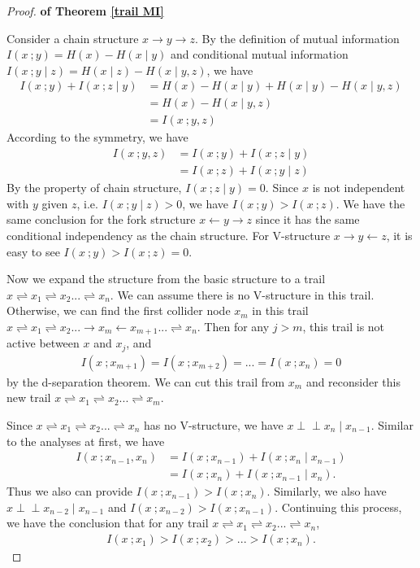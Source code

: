 \documentclass[twoside,11pt]{article}
\begin{document}
\begin{proof}{\textbf{of Theorem \ref{trail MI}}}

Consider a chain structure $x\to y\to z$. By the definition of mutual information $I(x\ ;y)=H(x)-H(x\mid y)$ and conditional mutual information $I(x\ ;y\mid z)=H(x\mid z)-H(x\mid y, z)$, we have 
\begin{align*}
I(x\ ;y)+I(x\ ;z\mid y)&=H(x)-H(x\mid y)+H(x\mid y)-H(x\mid y,z)\\
&=H(x)-H(x\mid y,z)\\
&=I(x\ ;y,z)
\end{align*}
According to the symmetry, we have
\begin{align*}
I(x\ ;y,z)&=I(x\ ;y)+I(x\ ;z\mid y)\\
&=I(x\ ;z)+I(x\ ;y\mid z)
\end{align*}
By the property of chain structure, $I(x\ ;z\mid y)=0$. Since $x$ is not independent with $y$ given $z$, i.e. $I(x\ ;y\mid z)>0$, we have $I(x\ ;y)>I(x\ ;z)$. We have the same conclusion for the fork structure $x\gets y\to z$ since it has the same conditional independency as the chain structure. For V-structure $x\to y\gets z$, it is easy to see $I(x\ ;y)>I(x\ ;z)=0$.

Now we expand the structure from the basic structure to a trail $x\rightleftharpoons x_1 \rightleftharpoons x_2 ... \rightleftharpoons x_n$. We can assume there is no V-structure in this trail. Otherwise, we can find the first collider node $x_m$ in this trail $x\rightleftharpoons x_1 \rightleftharpoons x_2 ...\to x_m \gets x_{m+1} ... \rightleftharpoons x_n$. Then for any $j>m$, this trail is not active between $x$ and $x_j$, and 
\begin{align*}
I(x\ ;x_{m+1})=I(x\ ;x_{m+2})=...=I(x\ ;x_n)=0
\end{align*}
by the d-separation theorem. We can cut this trail from $x_m$ and reconsider this new trail $x\rightleftharpoons x_1 \rightleftharpoons x_2 ... \rightleftharpoons x_m$. 

Since $x\rightleftharpoons x_1 \rightleftharpoons x_2 ... \rightleftharpoons x_n$ has no V-structure, we have $x\perp\!\!\!\perp x_{n}\mid x_{n-1}$. Similar to the analyses at first, we have 
\begin{align*}
I(x\ ;x_{n-1},x_n)&=I(x\ ;x_{n-1})+I(x\ ;x_n\mid x_{n-1})\\
&=I(x\ ;x_n)+I(x\ ;x_{n-1}\mid x_n).
\end{align*}
Thus we also can provide $I(x\ ;x_{n-1})>I(x\ ;x_n)$. Similarly, we also have $x\perp\!\!\!\perp x_{n-2}\mid x_{n-1}$ and $I(x\ ;x_{n-2})>I(x\ ;x_{n-1})$. Continuing this process, we have the conclusion that for any trail $x\rightleftharpoons x_1 \rightleftharpoons x_2 ... \rightleftharpoons x_n$,
\begin{align*}
I(x\ ;x_1)>I(x\ ;x_2)>...>I(x\ ;x_n).
\end{align*}


\end{proof}
\end{document}
